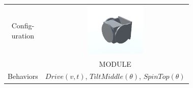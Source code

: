 \documentclass{standalone}
\newcommand{\picHeight}{1in}
\begin{document}
        \begin{tabular}{| c | c |}
            \hline
            \pbox{20cm}{Config-\\uration} &
\includegraphics[height=\picHeight]{unity/singleModule.png} \\
            ~ & MODULE \\ \hline
            Behaviors &
            \pbox{20cm}{\(Drive(v,t)\), \(TiltMiddle(\theta)\), \\ \(SpinTop(\theta) \)} \\ \hline
        \end{tabular}
\end{document}
